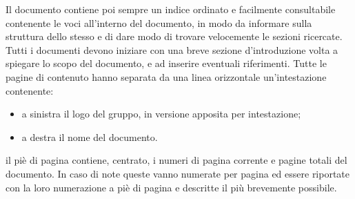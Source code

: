 	    Il documento contiene poi sempre un indice ordinato e facilmente consultabile contenente le voci all'interno del documento, in modo da informare sulla struttura dello stesso e di dare modo di trovare velocemente le sezioni ricercate.
	    Tutti i documenti devono iniziare con una breve sezione d'introduzione volta a spiegare lo scopo del documento, e ad inserire eventuali riferimenti.
	    Tutte le pagine di contenuto hanno separata da una linea orizzontale un'intestazione contenente:
	    \begin{itemize}
	        \item a sinistra il logo del gruppo, in versione apposita per intestazione;
	        \item a destra il nome del documento.
	    \end{itemize}
	    il piè di pagina contiene, centrato, i numeri di pagina corrente e pagine totali del documento.
	    In caso di note queste vanno numerate per pagina ed essere riportate con la loro numerazione a piè di pagina e descritte il più brevemente possibile.
